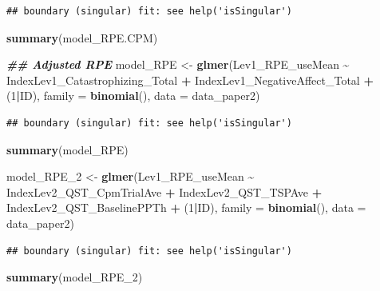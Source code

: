 \documentclass[
  12pt,
]{article}
\newenvironment{Shaded}{\begin{snugshade}}{\end{snugshade}}
\newcommand{\AttributeTok}[1]{\textcolor[rgb]{0.13,0.29,0.53}{#1}}
\newcommand{\DecValTok}[1]{\textcolor[rgb]{0.00,0.00,0.81}{#1}}
\newcommand{\DocumentationTok}[1]{\textcolor[rgb]{0.56,0.35,0.01}{\textbf{\textit{#1}}}}
\newcommand{\FunctionTok}[1]{\textcolor[rgb]{0.13,0.29,0.53}{\textbf{#1}}}
\newcommand{\NormalTok}[1]{#1}
\newcommand{\OtherTok}[1]{\textcolor[rgb]{0.56,0.35,0.01}{#1}}
\newcommand{\SpecialCharTok}[1]{\textcolor[rgb]{0.81,0.36,0.00}{\textbf{#1}}}
\begin{document}
\begin{verbatim}
## boundary (singular) fit: see help('isSingular')
\end{verbatim}

\begin{Shaded}
\begin{Highlighting}[]
\FunctionTok{summary}\NormalTok{(model\_RPE.CPM)}
\end{Highlighting}
\end{Shaded}

\begin{Shaded}
\begin{Highlighting}[]
\DocumentationTok{\#\# Adjusted RPE}
\NormalTok{model\_RPE }\OtherTok{\textless{}{-}} \FunctionTok{glmer}\NormalTok{(Lev1\_RPE\_useMean }\SpecialCharTok{\textasciitilde{}}\NormalTok{  IndexLev1\_Catastrophizing\_Total }\SpecialCharTok{+}\NormalTok{ IndexLev1\_NegativeAffect\_Total }\SpecialCharTok{+}\NormalTok{ (}\DecValTok{1}\SpecialCharTok{|}\NormalTok{ID), }\AttributeTok{family =} \FunctionTok{binomial}\NormalTok{(), }\AttributeTok{data =}\NormalTok{ data\_paper2)}
\end{Highlighting}
\end{Shaded}

\begin{verbatim}
## boundary (singular) fit: see help('isSingular')
\end{verbatim}

\begin{Shaded}
\begin{Highlighting}[]
\FunctionTok{summary}\NormalTok{(model\_RPE)}

\NormalTok{model\_RPE\_2 }\OtherTok{\textless{}{-}} \FunctionTok{glmer}\NormalTok{(Lev1\_RPE\_useMean }\SpecialCharTok{\textasciitilde{}}\NormalTok{ IndexLev2\_QST\_CpmTrialAve }\SpecialCharTok{+}\NormalTok{ IndexLev2\_QST\_TSPAve }\SpecialCharTok{+}\NormalTok{ IndexLev2\_QST\_BaselinePPTh }\SpecialCharTok{+}\NormalTok{ (}\DecValTok{1}\SpecialCharTok{|}\NormalTok{ID), }\AttributeTok{family =} \FunctionTok{binomial}\NormalTok{(), }\AttributeTok{data =}\NormalTok{ data\_paper2)}
\end{Highlighting}
\end{Shaded}

\begin{verbatim}
## boundary (singular) fit: see help('isSingular')
\end{verbatim}

\begin{Shaded}
\begin{Highlighting}[]
\FunctionTok{summary}\NormalTok{(model\_RPE\_2)}
\end{Highlighting}
\end{Shaded}
\end{document}
